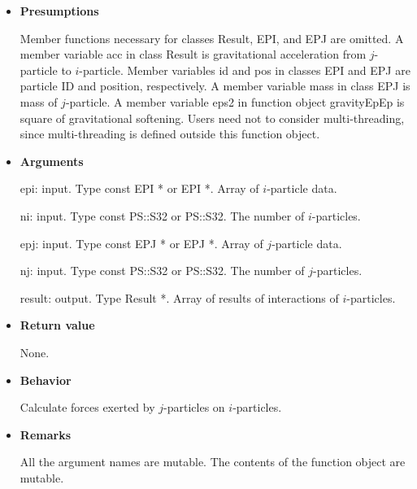 \begin{itemize}

\item {\bf Presumptions}

  Member functions necessary for classes Result, EPI, and EPJ are
  omitted. A member variable acc in class Result is gravitational
  acceleration from $j$-particle to $i$-particle. Member variables id
  and pos in classes EPI and EPJ are particle ID and position,
  respectively. A member variable mass in class EPJ is mass of
  $j$-particle. A member variable eps2 in function object gravityEpEp
  is square of gravitational softening. Users need not to consider
  multi-threading, since multi-threading is defined outside this
  function object.

\item {\bf Arguments}

  epi: input. Type const EPI * or EPI *. Array of $i$-particle data.

  ni: input. Type const PS::S32 or PS::S32. The number of
  $i$-particles.

  epj: input. Type const EPJ * or EPJ *. Array of $j$-particle data.
  
  nj: input. Type const PS::S32 or PS::S32. The number of
  $j$-particles.

  result: output. Type Result *. Array of results of interactions of
  $i$-particles.

\item {\bf Return value}

  None.
  
\item {\bf Behavior}

  Calculate forces exerted by $j$-particles on $i$-particles.
  
\item {\bf Remarks}

  All the argument names are mutable. The contents of the function
  object are mutable.
  
\end{itemize}

